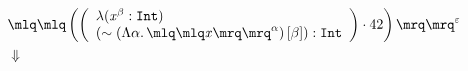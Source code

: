 \documentclass{article}
\begin{document}
\tiny\begin{align*}
&\quot{\left(\left(\begin{array}{l} \lambda (\mathit{x}^{\mathit{\beta}}:\mathtt{Int})\\(\sim \left( \Lambda \mathit{\alpha}.\,\quot{\mathit{x}}^{\mathit{\alpha}}\right)[\mathit{\beta}]) : \mathtt{Int}\end{array}\right)\cdot 42\right)}^{\varepsilon}\\ 
&\Downarrow\\ 
\end{align*}
\end{document}
